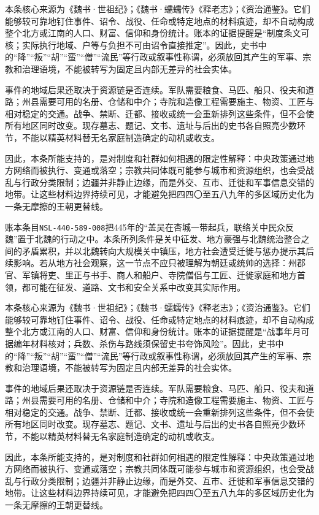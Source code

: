 本条核心来源为《魏书·世祖纪》；《魏书·蠕蠕传》《释老志》；《资治通鉴》。它们能够较可靠地钉住事件、诏令、战役、任命或特定地点的材料痕迹，却不自动构成整个北方或江南的人口、财富、信仰和身份统计。账本的证据提醒是“制度条文可核；实际执行地域、户等与负担不可由诏令直接推定”。因此，史书中的“降”“叛”“胡”“蛮”“僧”“流民”等行政或叙事性称谓，必须放回其产生的军事、宗教和治理语境，不能被转写为固定且内部无差异的社会实体。

事件的地域后果还取决于资源链是否连续。军队需要粮食、马匹、船只、役夫和道路；州县需要可用的名册、仓储和中介；寺院和造像工程需要施主、物资、工匠与相对稳定的交通。战争、禁断、迁都、接收或统一会重新排列这些条件，但不会使所有地区同时改变。现存墓志、题记、文书、遗址与后出的史书各自照亮少数环节，不能以精英材料替无名家庭制造确定的动机或收支。

因此，本条所能支持的，是对制度和社群如何相遇的限定性解释：中央政策通过地方网络而被执行、变通或落空；宗教共同体既可能参与城市和资源组织，也会受战乱与行政分类限制；边疆并非静止边缘，而是外交、互市、迁徙和军事信息交错的地带。让这些材料边界持续可见，才能避免把四四〇至五八九年的多区域历史化为一条无摩擦的王朝更替线。

账本条目\texttt{NSL-440-589-008}把445年的“盖吴在杏城一带起兵，联络关中民众反魏”置于北魏的行动之中。本条所列条件是关中征发、地方豪强与北魏统治整合之间的矛盾累积，并以北魏转向大规模关中镇压，地方社会遭受迁徙与惩办提示其后续影响。若从地方社会观察，这一节点不应只被理解为朝廷或统帅的选择：州郡官、军镇将吏、里正与书手、商人和船户、寺院僧侣与工匠、迁徙家庭和地方首领，都可能在征发、道路、文书和安全关系中改变其实际作用。

本条核心来源为《魏书·世祖纪》；《魏书·蠕蠕传》《释老志》；《资治通鉴》。它们能够较可靠地钉住事件、诏令、战役、任命或特定地点的材料痕迹，却不自动构成整个北方或江南的人口、财富、信仰和身份统计。账本的证据提醒是“战事年月可据编年材料核对；兵数、杀伤与路线须保留史书夸饰风险”。因此，史书中的“降”“叛”“胡”“蛮”“僧”“流民”等行政或叙事性称谓，必须放回其产生的军事、宗教和治理语境，不能被转写为固定且内部无差异的社会实体。

事件的地域后果还取决于资源链是否连续。军队需要粮食、马匹、船只、役夫和道路；州县需要可用的名册、仓储和中介；寺院和造像工程需要施主、物资、工匠与相对稳定的交通。战争、禁断、迁都、接收或统一会重新排列这些条件，但不会使所有地区同时改变。现存墓志、题记、文书、遗址与后出的史书各自照亮少数环节，不能以精英材料替无名家庭制造确定的动机或收支。

因此，本条所能支持的，是对制度和社群如何相遇的限定性解释：中央政策通过地方网络而被执行、变通或落空；宗教共同体既可能参与城市和资源组织，也会受战乱与行政分类限制；边疆并非静止边缘，而是外交、互市、迁徙和军事信息交错的地带。让这些材料边界持续可见，才能避免把四四〇至五八九年的多区域历史化为一条无摩擦的王朝更替线。

